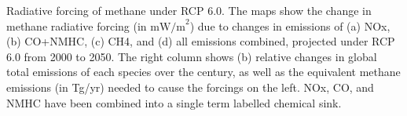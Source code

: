 Radiative forcing of methane under RCP 6.0. The maps show the change in methane radiative forcing (in $\mathrm{mW/m}^2$) due to changes in emissions of (a) NOx, (b) CO+NMHC, (c) CH4, and (d) all emissions combined, projected under RCP 6.0 from 2000 to 2050. The right column shows (b) relative changes in global total emissions of each species over the century, as well as the equivalent methane emissions (in Tg/yr) needed to cause the forcings on the left. NOx, CO, and NMHC have been combined into a single term labelled chemical sink.\label{fig:eqems}